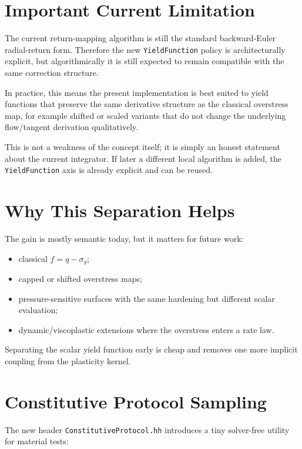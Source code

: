 \section{Important Current Limitation}

The current return-mapping algorithm is still the standard backward-Euler
radial-return form.  Therefore the new \texttt{YieldFunction} policy is
architecturally explicit, but algorithmically it is still expected to remain
compatible with the same correction structure.

In practice, this means the present implementation is best suited to yield
functions that preserve the same derivative structure as the classical
overstress map, for example shifted or scaled variants that do not change the
underlying flow/tangent derivation qualitatively.

This is not a weakness of the concept itself; it is simply an honest statement
about the current integrator.  If later a different local algorithm is added,
the \texttt{YieldFunction} axis is already explicit and can be reused.

\section{Why This Separation Helps}

The gain is mostly semantic today, but it matters for future work:

\begin{itemize}
  \item classical \(f = q - \sigma_y\);
  \item capped or shifted overstress maps;
  \item pressure-sensitive surfaces with the same hardening but different
        scalar evaluation;
  \item dynamic/viscoplastic extensions where the overstress enters a rate law.
\end{itemize}

Separating the scalar yield function early is cheap and removes one more
implicit coupling from the plasticity kernel.

\section{Constitutive Protocol Sampling}

The new header \texttt{ConstitutiveProtocol.hh} introduces a tiny solver-free
utility for material tests:

